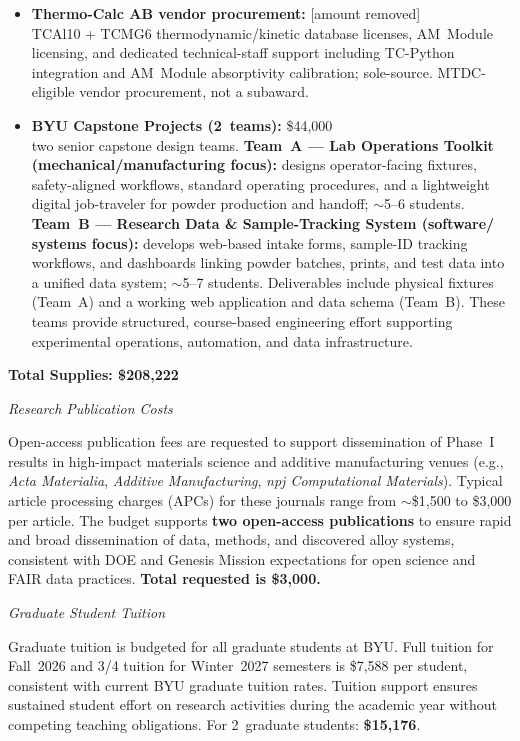 \documentclass[11pt,letterpaper]{article}
\begin{document}
\begin{itemize}
\item \textbf{Thermo-Calc AB vendor procurement:} [amount removed] \\
TCAl10 + TCMG6 thermodynamic/kinetic database licenses, AM~Module
licensing, and dedicated technical-staff support including
TC-Python integration and AM~Module absorptivity calibration;
sole-source. MTDC-eligible vendor procurement, not a subaward.

\item \textbf{BYU Capstone Projects (2~teams):} \$44,000 \\
two senior capstone design teams.
\textbf{Team~A --- Lab Operations Toolkit (mechanical/manufacturing
focus):} designs operator-facing fixtures, safety-aligned workflows,
standard operating procedures, and a lightweight digital job-traveler
for powder production and handoff; $\sim$5--6 students.
\textbf{Team~B --- Research Data \& Sample-Tracking System (software/
systems focus):} develops web-based intake forms, sample-ID tracking
workflows, and dashboards linking powder batches, prints, and test
data into a unified data system; $\sim$5--7 students. Deliverables
include physical fixtures (Team~A) and a working web application and
data schema (Team~B). These teams provide structured, course-based
engineering effort supporting experimental operations, automation,
and data infrastructure.
\end{itemize}

\textbf{Total Supplies: \$208,222}

\textit{Research Publication Costs}

Open-access publication fees are requested to support dissemination
of Phase~I results in high-impact materials science and additive
manufacturing venues (e.g., \textit{Acta Materialia}, \textit{Additive
Manufacturing}, \textit{npj Computational Materials}). Typical article
processing charges (APCs) for these journals range from $\sim$\$1,500
to \$3,000 per article. The budget supports \textbf{two open-access
publications} to ensure rapid and broad dissemination of data,
methods, and discovered alloy systems, consistent with DOE and Genesis
Mission expectations for open science and FAIR data practices.
\textbf{Total requested is \$3,000.}

\textit{Graduate Student Tuition}

Graduate tuition is budgeted for all graduate students at BYU. Full
tuition for Fall~2026 and 3/4 tuition for Winter~2027
semesters is \$7,588 per student, consistent with current BYU
graduate tuition rates. Tuition support ensures sustained student
effort on research activities during the academic year without
competing teaching obligations. For 2~graduate students:
\textbf{\$15,176}.
\end{document}
